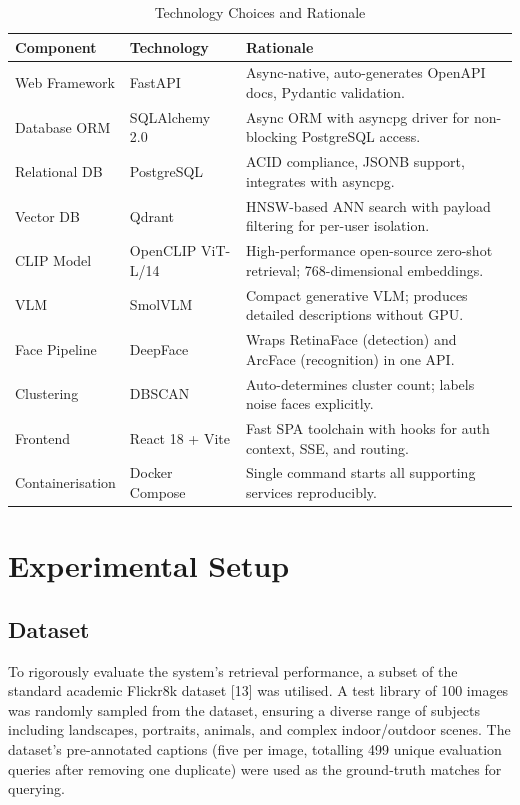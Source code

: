 \documentclass[12pt,a4paper,oneside]{report}
\begin{document}
\begin{table}[H]
\centering\small
\caption{Technology Choices and Rationale}
\label{tab:tech}
\renewcommand{\arraystretch}{1.4}
\begin{tabular}{|p{2.8cm}|p{3.2cm}|p{7.2cm}|}
\hline
\textbf{Component} & \textbf{Technology} & \textbf{Rationale} \\
\hline
Web Framework & FastAPI & Async-native, auto-generates OpenAPI docs, Pydantic validation. \\
\hline
Database ORM & SQLAlchemy 2.0 & Async ORM with asyncpg driver for non-blocking PostgreSQL access. \\
\hline
Relational DB & PostgreSQL & ACID compliance, JSONB support, integrates with asyncpg. \\
\hline
Vector DB & Qdrant & HNSW-based ANN search with payload filtering for per-user isolation. \\
\hline
CLIP Model & OpenCLIP ViT-L/14 & High-performance open-source zero-shot retrieval; 768-dimensional embeddings. \\
\hline
VLM & SmolVLM & Compact generative VLM; produces detailed descriptions without GPU. \\
\hline
Face Pipeline & DeepFace & Wraps RetinaFace (detection) and ArcFace (recognition) in one API. \\
\hline
Clustering & DBSCAN & Auto-determines cluster count; labels noise faces explicitly. \\
\hline
Frontend & React 18 + Vite & Fast SPA toolchain with hooks for auth context, SSE, and routing. \\
\hline
Containerisation & Docker Compose & Single command starts all supporting services reproducibly. \\
\hline
\end{tabular}
\end{table}


\chapter{Experimental Setup}

\section{Dataset}

To rigorously evaluate the system's retrieval performance, a subset of the standard academic Flickr8k dataset [13] was utilised. A test library of 100 images was randomly sampled from the dataset, ensuring a diverse range of subjects including landscapes, portraits, animals, and complex indoor/outdoor scenes. The dataset's pre-annotated captions (five per image, totalling 499 unique evaluation queries after removing one duplicate) were used as the ground-truth matches for querying.
\end{document}
